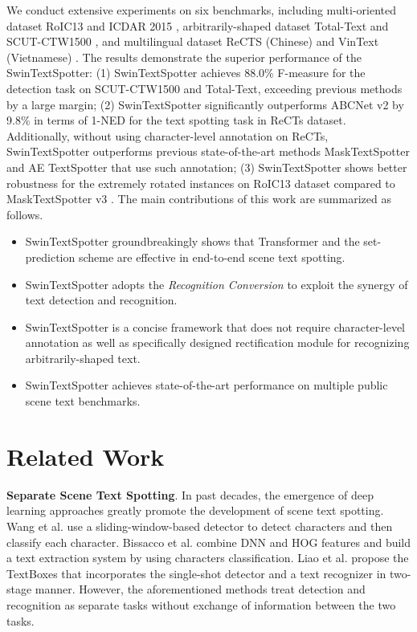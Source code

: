 \documentclass[10pt,twocolumn,letterpaper]{article}
\begin{document}
We conduct extensive experiments on six benchmarks, including multi-oriented dataset RoIC13 \cite{liao2020mask} and ICDAR 2015 \cite{karatzas2015icdar}, arbitrarily-shaped dataset Total-Text \cite{ch2020total} and SCUT-CTW1500 \cite{liu2019curved}, and multilingual dataset ReCTS (Chinese) \cite{zhang2019icdar} and VinText (Vietnamese) \cite{m_Nguyen-etal-CVPR21}. The results demonstrate the superior performance of the SwinTextSpotter: 
(1) SwinTextSpotter achieves 88.0\% F-measure for the detection task on SCUT-CTW1500 and Total-Text, exceeding previous methods by a large margin; 
(2) SwinTextSpotter significantly outperforms ABCNet v2 \cite{liu2021abcnetv2} by 9.8\% in terms of 1-NED for the text spotting task in ReCTs dataset.
Additionally, without using character-level annotation on ReCTs, SwinTextSpotter outperforms previous state-of-the-art methods MaskTextSpotter \cite{liao2019mask} and AE TextSpotter \cite{wang2020ae} that use such annotation; 
(3) SwinTextSpotter shows better robustness for the extremely rotated instances on RoIC13 dataset compared to MaskTextSpotter v3 \cite{liao2019mask}.
The main contributions of this work are summarized as follows.
\begin{itemize}
\item SwinTextSpotter groundbreakingly shows that Transformer and the set-prediction scheme are effective in end-to-end scene text spotting.
\item SwinTextSpotter adopts the \textit{Recognition Conversion} to exploit the synergy of text detection and recognition.
\item SwinTextSpotter is a concise framework that does not require character-level annotation as well as specifically designed rectification module for recognizing arbitrarily-shaped text.
\item SwinTextSpotter achieves state-of-the-art performance on multiple public scene text benchmarks. 
\end{itemize}


\section{Related Work}

\textbf{Separate Scene Text Spotting}.
In past decades, the emergence of deep learning approaches greatly promote the development of scene text spotting. Wang et al. \cite{wang2011end} use a sliding-window-based detector to detect characters and then classify each character. Bissacco et al. \cite{bissacco2013photoocr} combine DNN and HOG features and build a text extraction system by using characters classification. Liao et al. \cite{liao2017textboxes} propose the TextBoxes that incorporates the single-shot detector and a text recognizer \cite{shi2016end} in two-stage manner. However, the aforementioned methods treat detection and recognition as separate tasks without exchange of information between the two tasks. 
\end{document}
